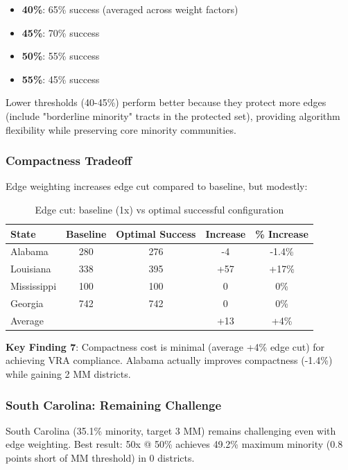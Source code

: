 \begin{itemize}
\item \textbf{40\%}: 65\% success (averaged across weight factors)
\item \textbf{45\%}: 70\% success
\item \textbf{50\%}: 55\% success
\item \textbf{55\%}: 45\% success
\end{itemize}

Lower thresholds (40-45\%) perform better because they protect more edges (include "borderline minority" tracts in the protected set), providing algorithm flexibility while preserving core minority communities.

\subsubsection{Compactness Tradeoff}

Edge weighting increases edge cut compared to baseline, but modestly:

\begin{table}[h]
\centering
\begin{tabular}{lcccc}
\toprule
State & Baseline & Optimal Success & Increase & \% Increase \\
\midrule
Alabama & 280 & 276 & -4 & -1.4\% \\
Louisiana & 338 & 395 & +57 & +17\% \\
Mississippi & 100 & 100 & 0 & 0\% \\
Georgia & 742 & 742 & 0 & 0\% \\
\midrule
Average & & & +13 & +4\% \\
\bottomrule
\end{tabular}
\caption{Edge cut: baseline (1x) vs optimal successful configuration}
\label{tab:compactness_tradeoff}
\end{table}

\textbf{Key Finding 7}: Compactness cost is minimal (average +4\% edge cut) for achieving VRA compliance. Alabama actually improves compactness (-1.4\%) while gaining 2 MM districts.

\subsubsection{South Carolina: Remaining Challenge}

South Carolina (35.1\% minority, target 3 MM) remains challenging even with edge weighting. Best result: 50x @ 50\% achieves 49.2\% maximum minority (0.8 points short of MM threshold) in 0 districts.

